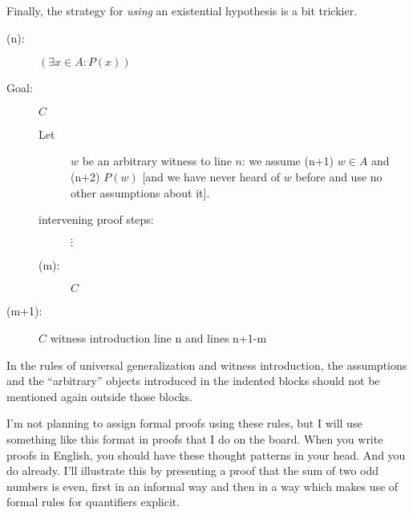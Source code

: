 \documentclass[12pt]{article}
\begin{document}
Finally, the strategy for {\em using\/} an existential hypothesis is a bit trickier.

\begin{description}

\item[(n):]  $(\exists x \in A:P(x))$

\item[Goal:] $C$

\begin{description}
 \item[Let]  $w$ be an arbitrary witness to line $n$:  we assume (n+1) $w \in A$ and (n+2) $P(w)$ [and we have never heard of $w$ before and use no other assumptions about it].

\item[intervening proof steps:]  $\vdots$

\item[(m):]  $C$

\end{description}

\item[(m+1):]  $C$ witness introduction line n and lines n+1-m

\end{description}

In the rules of universal generalization and witness introduction, the assumptions and the ``arbitrary'' objects introduced in the indented blocks should not be mentioned again outside those blocks.

I'm not planning to assign formal proofs using these rules, but I will use something like this format in proofs that I do on the board.  When you write proofs in English, you should have these thought patterns in your head.  And you do already.  I'll illustrate this by presenting a  proof that the sum of two odd numbers is even, first in an informal way and then in a way which makes use of formal rules for quantifiers explicit.

\newpage
\end{document}

